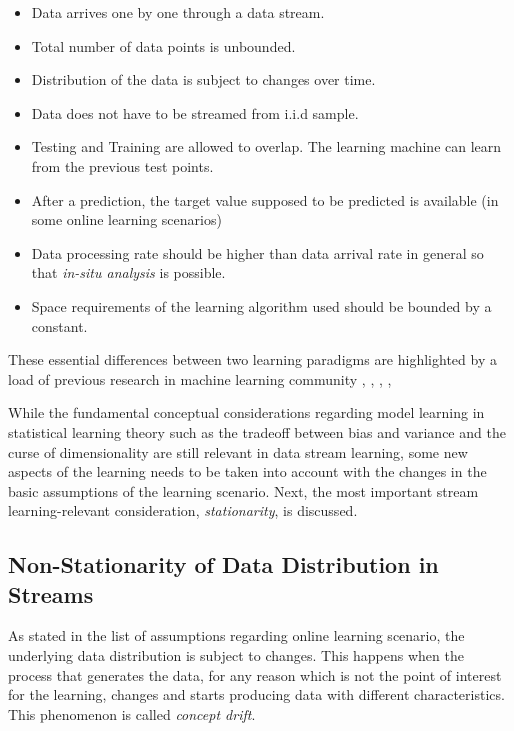 {\begin{itemize}
\item Data arrives one by one through a data stream.
\item Total number of data points is unbounded.
\item Distribution of the data is subject to changes over time.
\item Data does not have to be streamed from i.i.d sample.
\item Testing and Training are allowed to overlap. The learning machine can learn from the previous test points.
\item After a prediction, the target value supposed to be predicted is available (in some online learning scenarios)
\item Data processing rate should be higher than data arrival rate in general so that {\it in-situ analysis} is possible.
\item Space requirements of the learning algorithm used should be bounded by a constant.
\end{itemize}

These essential differences between two learning paradigms are highlighted by a load of previous research in machine learning community \cite{li_towards_2014}, \cite{gama_evaluating_2013}, \cite{domingos_catching_2001}, \cite{nguyen-tuong_incremental_2008}, \cite{vovk_algorithmic_2005} 

While the fundamental conceptual considerations regarding model learning in statistical learning theory such as the tradeoff between bias and variance and the curse of dimensionality are still relevant in data stream learning, some new aspects of the learning needs to be taken into account with the changes in the basic assumptions of the learning scenario. Next, the most important stream learning-relevant consideration, \textit{stationarity}, is discussed.

\subsection{Non-Stationarity of Data Distribution in Streams}
\label{subsection:2.4.1}

As stated in the list of assumptions regarding online learning scenario, the underlying data distribution is subject to changes. This happens when the process that generates the data, for any reason which is not the point of interest for the learning, changes and starts producing data with different characteristics. This phenomenon is called \textit{concept drift}.

}
